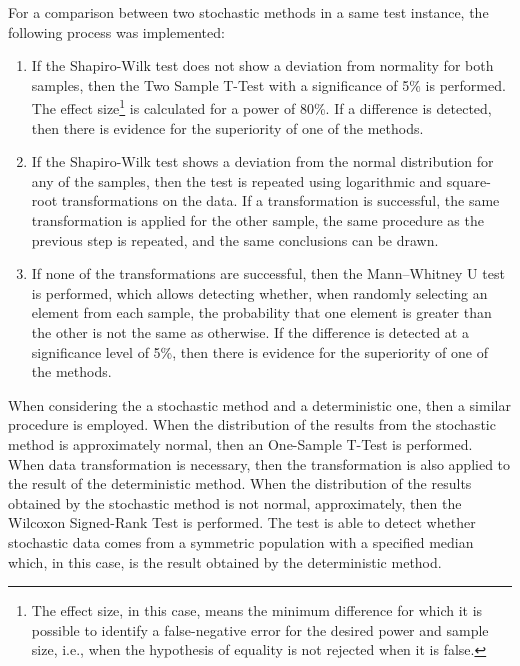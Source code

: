 			For a comparison between two stochastic methods in a same test instance, the following process was implemented:
			\begin{enumerate}
				\item If the Shapiro-Wilk test does not show a deviation from normality for both samples, then the Two Sample T-Test with a significance of 5\% is performed. The effect size\footnote{The effect size, in this case, means the minimum difference for which it is possible to identify a false-negative error for the desired power and sample size, i.e., when the hypothesis of equality is not rejected when it is false.} is calculated for a power of 80\%. If a difference is detected, then there is evidence for the superiority of one of the methods.
				\item If the Shapiro-Wilk test shows a deviation from the normal distribution for any of the samples, then the test is repeated using logarithmic and square-root transformations on the data. If a transformation is successful, the same transformation is applied for the other sample, the same procedure as the previous step is repeated, and the same conclusions can be drawn.
				\item If none of the transformations are successful, then the Mann–Whitney U test is performed, which allows detecting whether, when randomly selecting an element from each sample, the probability that one element is greater than the other is not the same as otherwise. If the difference is detected at a significance level of 5\%, then there is evidence for the superiority of one of the methods.
			\end{enumerate}
		
			When considering the a stochastic method and a deterministic one, then a similar procedure is employed. When the distribution of the results from the stochastic method is approximately normal, then an One-Sample T-Test is performed. When data transformation is necessary, then the transformation is also applied to the result of the deterministic method. When the distribution of the results obtained by the stochastic method is not normal, approximately, then the Wilcoxon Signed-Rank Test is performed. The test is able to detect whether stochastic data comes from a symmetric population with a specified median which, in this case, is the result obtained by the deterministic method.
			
